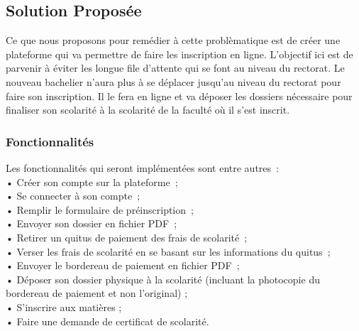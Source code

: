 \documentclass[12pt,a4paper]{article}
\begin{document}
	\subsection{Solution Proposée}
	Ce que nous proposons pour remédier à cette problèmatique est de créer une plateforme qui va permettre de faire les inscription en ligne. L’objectif ici est de parvenir à éviter les longue file d’attente qui se font au niveau du rectorat. Le nouveau bachelier n’aura plus à se déplacer jusqu’au niveau du rectorat pour faire son inscription. Il le fera en ligne et va déposer les dossiers nécessaire pour finaliser son scolarité à la scolarité de la faculté où il s’est inscrit.
	
	\subsubsection{Fonctionnalités}
	Les fonctionnalités qui seront implémentées sont entre autres : \\
	• Créer son compte sur la plateforme ;\\
	• Se connecter à son compte ;\\
	• Remplir le formulaire de préinscription ;\\
	• Envoyer son dossier en fichier PDF ;\\
	• Retirer un quitus de paiement des frais de scolarité ;\\
	• Verser les frais de scolarité en se basant sur les informations du quitus ;\\
	• Envoyer le bordereau de paiement en fichier PDF ;\\
	• Déposer son dossier physique à la scolarité (incluant la photocopie du bordereau de paiement et non l’original) ;\\
	• S’inscrire aux matières ;\\
	• Faire une demande de certificat de scolarité.\\
		
	
\end{document}
